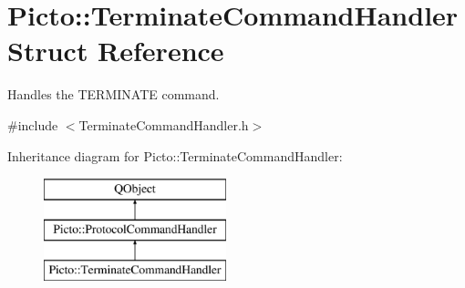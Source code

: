 \hypertarget{struct_picto_1_1_terminate_command_handler}{\section{Picto\-:\-:Terminate\-Command\-Handler Struct Reference}
\label{struct_picto_1_1_terminate_command_handler}
}


Handles the T\-E\-R\-M\-I\-N\-A\-T\-E command.  




{\ttfamily \#include $<$Terminate\-Command\-Handler.\-h$>$}

Inheritance diagram for Picto\-:\-:Terminate\-Command\-Handler\-:\begin{figure}[H]
\begin{center}
\leavevmode
\includegraphics[height=3.000000cm]{struct_picto_1_1_terminate_command_handler}
\end{center}
\end{figure}

